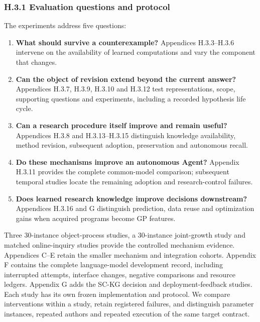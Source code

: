 \documentclass[11pt,a4paper]{article}
\begin{document}
\subsubsection*{H.3.1 Evaluation questions and protocol}

The experiments address five questions:


\begin{enumerate}

\item 
\textbf{What should survive a counterexample?} Appendices H.3.3–H.3.6 intervene on the
availability of learned computations and vary the component that changes.


\item 
\textbf{Can the object of revision extend beyond the current answer?} Appendices
H.3.7, H.3.9, H.3.10 and H.3.12 test representations, scope, supporting questions and
experiments, including a recorded hypothesis life cycle.


\item 
\textbf{Can a research procedure itself improve and remain useful?} Appendices
H.3.8 and H.3.13–H.3.15 distinguish knowledge availability, method revision,
subsequent adoption, preservation and autonomous recall.


\item 
\textbf{Do these mechanisms improve an autonomous Agent?} Appendix H.3.11 provides the
complete common-model comparison; subsequent temporal studies locate the
remaining adoption and research-control failures.


\item 
\textbf{Does learned research knowledge improve decisions downstream?} Appendices
H.3.16 and G distinguish prediction, data reuse and optimization gains
when acquired programs become GP features.


\end{enumerate}

Three 30-instance object-process studies, a 30-instance joint-growth study and
matched online-inquiry studies provide the controlled mechanism evidence.
Appendices C–E retain the smaller mechanism and integration cohorts. Appendix F
contains the complete language-model development record, including interrupted
attempts, interface changes, negative comparisons and resource ledgers. Appendix G
adds the SC-KG decision and deployment-feedback studies. Each study has its own
frozen implementation and protocol. We compare interventions
within a study, retain registered failures, and distinguish parameter instances,
repeated authors and repeated execution of the same target contract.
\end{document}
